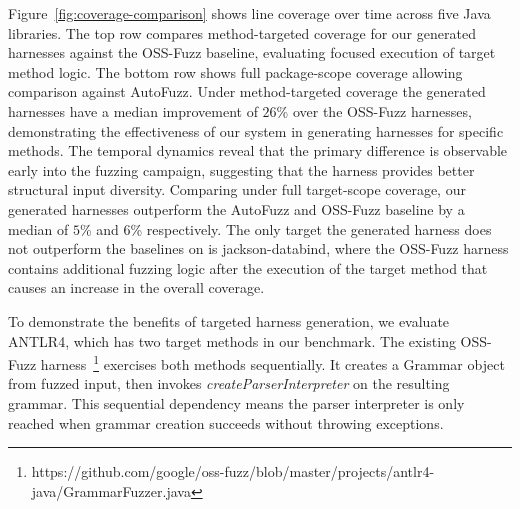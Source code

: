 Figure~\ref{fig:coverage-comparison} shows line coverage over time across five Java libraries. The top row compares method-targeted coverage for our generated harnesses against the OSS-Fuzz baseline, evaluating focused execution of target method logic. The bottom row shows full package-scope coverage allowing comparison against AutoFuzz.
Under method-targeted coverage the generated harnesses have a median improvement of $26$\% over the OSS-Fuzz harnesses, demonstrating the effectiveness of our system in generating harnesses for specific methods. The temporal dynamics reveal that the primary difference is observable early into the fuzzing campaign, suggesting that the harness provides better structural input diversity.
Comparing under full target-scope coverage, our generated harnesses outperform the AutoFuzz and OSS-Fuzz baseline by a median of $5$\% and $6$\% respectively. The only target the generated harness does not outperform the baselines on is jackson-databind, where the  OSS-Fuzz harness contains additional fuzzing logic after the execution of the target method that causes an increase in the overall coverage.
%
%
%
\par
To demonstrate the benefits of targeted harness generation, we evaluate ANTLR4, which has two target methods in our benchmark. The existing OSS-Fuzz harness~\footnote{https://github.com/google/oss-fuzz/blob/master/projects/antlr4-java/GrammarFuzzer.java} exercises both methods sequentially. It creates a Grammar object from fuzzed input, then invokes \textit{createParserInterpreter} on the resulting grammar. This sequential dependency means the parser interpreter is only reached when grammar creation succeeds without throwing exceptions.
